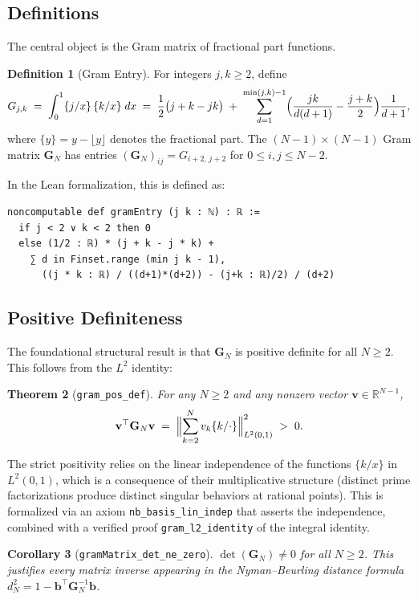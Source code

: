 \documentclass[11pt,a4paper]{article}
\newtheorem{theorem}{Theorem}[section]
\newtheorem{corollary}[theorem]{Corollary}
\theoremstyle{definition}
\newtheorem{definition}[theorem]{Definition}
\theoremstyle{remark}
\newcommand{\Gram}{\mathbf{G}}
\newcommand{\fpart}[1]{\{#1\}}
\newcommand{\lean}[1]{\texttt{#1}}
\begin{document}
\subsection{Definitions}

The central object is the Gram matrix of fractional part functions.

\begin{definition}[Gram Entry]
For integers $j, k \geq 2$, define
\[
  G_{j,k} \;=\; \int_0^1 \fpart{j/x}\,\fpart{k/x}\;dx
  \;=\; \frac{1}{2}\bigl(j + k - jk\bigr) \;+\;
  \sum_{d=1}^{\min(j,k)-1} \Bigl(\frac{jk}{d(d+1)} - \frac{j+k}{2}\Bigr)\frac{1}{d+1},
\]
where $\{y\} = y - \lfloor y \rfloor$ denotes the fractional part.
The $(N{-}1) \times (N{-}1)$ Gram matrix $\Gram_N$ has entries $(\Gram_N)_{ij} = G_{i+2,\,j+2}$
for $0 \leq i,j \leq N-2$.
\end{definition}

In the Lean formalization, this is defined as:
\begin{lstlisting}
noncomputable def gramEntry (j k : ℕ) : ℝ :=
  if j < 2 ∨ k < 2 then 0
  else (1/2 : ℝ) * (j + k - j * k) +
    ∑ d in Finset.range (min j k - 1),
      ((j * k : ℝ) / ((d+1)*(d+2)) - (j+k : ℝ)/2) / (d+2)
\end{lstlisting}

\subsection{Positive Definiteness}

The foundational structural result is that $\Gram_N$ is positive definite
for all $N \geq 2$. This follows from the $L^2$ identity:

\begin{theorem}[\lean{gram\_pos\_def}]
For any $N \geq 2$ and any nonzero vector $\mathbf{v} \in \mathbb{R}^{N-1}$,
\[
  \mathbf{v}^\top \Gram_N \mathbf{v} \;=\;
  \Bigl\|\sum_{k=2}^{N} v_k \fpart{k/\cdot}\Bigr\|_{L^2(0,1)}^2 \;>\; 0.
\]
\end{theorem}

The strict positivity relies on the linear independence of the functions
$\{k/x\}$ in $L^2(0,1)$, which is a consequence of their multiplicative
structure (distinct prime factorizations produce distinct singular
behaviors at rational points). This is formalized via an axiom
\lean{nb\_basis\_lin\_indep} that asserts the independence, combined with
a verified proof \lean{gram\_l2\_identity} of the integral identity.

\begin{corollary}[\lean{gramMatrix\_det\_ne\_zero}]
$\det(\Gram_N) \neq 0$ for all $N \geq 2$.
This justifies every matrix inverse appearing in the Nyman--Beurling
distance formula $d_N^2 = 1 - \mathbf{b}^\top \Gram_N^{-1}\mathbf{b}$.
\end{corollary}
\end{document}
